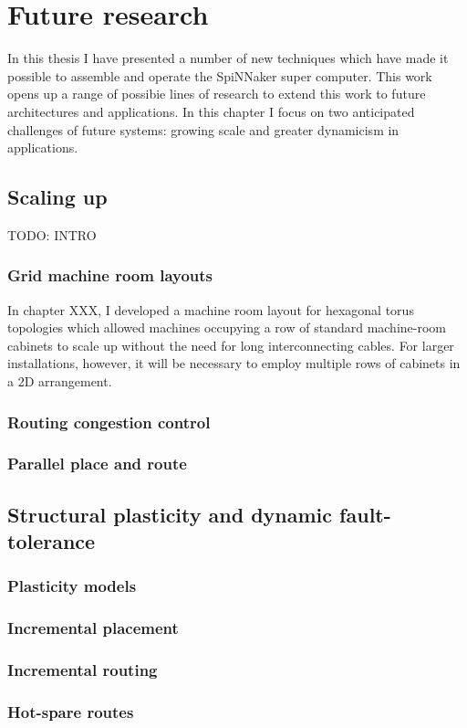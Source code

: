 \chapter{Future research}
	
	In this thesis I have presented a number of new techniques which have made it
	possible to assemble and operate the SpiNNaker super computer. This work
	opens up a range of possibie lines of research to extend this work to future
	architectures and applications. In this chapter I focus on two anticipated
	challenges of future systems: growing scale and greater dynamicism in
	applications.
	
	\section{Scaling up}
		
		TODO: INTRO
		
		\subsection{Grid machine room layouts}
			
			In chapter XXX, I developed a machine room layout for hexagonal torus
			topologies which allowed machines occupying a row of standard
			machine-room cabinets to scale up without the need for long
			interconnecting cables. For larger installations, however, it will be
			necessary to employ multiple rows of cabinets in a 2D arrangement.
		
		\subsection{Routing congestion control}
		
		\subsection{Parallel place and route}
	
	\section{Structural plasticity and dynamic fault-tolerance}
		\subsection{Plasticity models}
		\subsection{Incremental placement}
		\subsection{Incremental routing}
		\subsection{Hot-spare routes}
